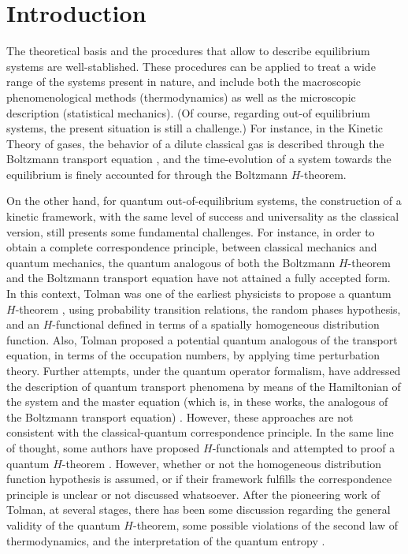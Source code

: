 \section{Introduction}

The theoretical basis and the procedures that allow to describe equilibrium systems
are well-stablished. These procedures can be applied to treat a wide range of the systems
present in nature, and include both the macroscopic phenomenological methods (thermodynamics)
as well as the microscopic description (statistical mechanics).
(Of course, regarding out-of equilibrium systems, the present situation is still a challenge.)
For instance,
in the Kinetic Theory of gases, the behavior of a dilute classical gas
is described through the Boltzmann transport equation \cite{bib:huang},
and the time-evolution of a system towards the equilibrium is finely accounted for
through the Boltzmann $H$-theorem.

On the other hand, for quantum out-of-equilibrium systems, the construction of a
kinetic framework, with the same level of
success and universality as the classical version, still presents some fundamental challenges. For instance,
in order to obtain a complete correspondence principle, between classical mechanics
and quantum mechanics, the quantum analogous of both the Boltzmann $H$-theorem
and the Boltzmann transport equation have not attained a fully accepted form.
In this context, Tolman was one of the earliest physicists to propose a quantum
$H$-theorem \cite{bib:tolman}, using probability transition relations, the random
phases hypothesis, and an $H$-functional defined in terms of a spatially homogeneous distribution function.
Also, Tolman proposed a potential quantum analogous of the transport equation,
in terms of the occupation numbers,
by applying time perturbation theory. Further attempts, under the quantum operator
formalism, have addressed the description of quantum transport phenomena by means of the Hamiltonian
of the system and the master equation (which is, in these works, the analogous
of the Boltzmann transport equation)
\cite{bib:grabert1974,%
bib:angel2017,
bib:amato2020,bib:nicacio2015,bib:hussein2014}. However, these approaches 
are not consistent with the classical-quantum correspondence principle.
In the same line of thought, some authors have proposed $H$-functionals
and attempted to proof a
quantum $H$-theorem \cite{bib:gorban2014,bib:bennaim2017,bib:silva2010,%
bib:deroeck2006,bib:acharya2019,bib:kastner2017,bib:han2015,bib:das2018,bib:vonneumann2010}.
However, whether or not the homogeneous distribution function hypothesis is assumed, or
if their framework fulfills the correspondence principle is unclear or not discussed whatsoever.
After the pioneering work of Tolman, at several stages, there has been some discussion regarding
the general validity of the quantum $H$-theorem,
some possible violations of the second law of thermodynamics, and the
interpretation of the quantum entropy  %
\cite{bib:silva2010,bib:acharya2019,bib:kastner2017,bib:han2015,bib:brown2008,%
bib:dragoljub2009,bib:vonneumann2010,%
bib:syros1999,bib:lesovik2016,
bib:lesovik2019}.

